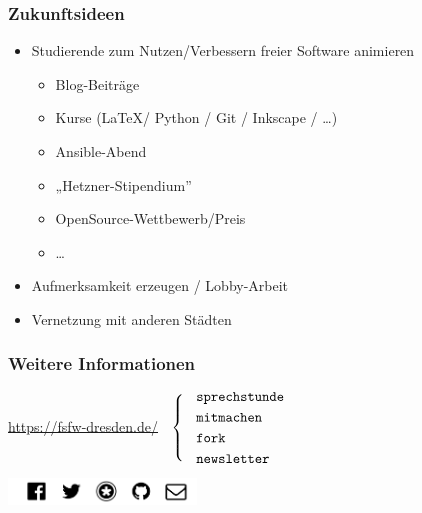 \documentclass{beamer}
\begin{document}
\begin{frame}[label=ct3]
  \frametitle{Zukunftsideen}

  \begin{itemize}
  \item Studierende zum Nutzen/Verbessern freier Software animieren
    \begin{itemize}
    \item Blog-Beiträge
    \item Kurse (\LaTeX / Python / Git / Inkscape / \dots)
    \item Ansible-Abend
    \item „Hetzner-Stipendium”
    \item OpenSource-Wettbewerb/Preis
    \item \dots
    \end{itemize}

    \bigskip

  \item Aufmerksamkeit erzeugen / Lobby-Arbeit

    \bigskip

  \item Vernetzung mit anderen Städten

  \end{itemize}

\end{frame}

\begin{frame}[label=ct4]
  \frametitle{Weitere Informationen}

  \onslide<+->

  \begin{center}
    \url{https://fsfw-dresden.de/}
    $\;\;\left\{\;\;\text{
        \parbox{2.3cm}{
          \texttt{sprechstunde}\\[1mm]
          \texttt{mitmachen}\\[1mm]
          \texttt{fork}\\[1mm]
          \texttt{newsletter}
        }}
    \right.$

    \vspace*{2\bigskipamount}

    \includegraphics[width=50mm]{img-src/fsfw-netzwerke}
  \end{center}

\end{frame}
\end{document}
